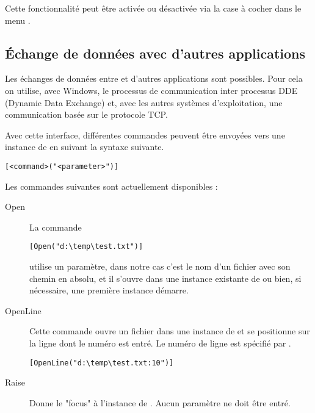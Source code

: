 
Cette fonctionnalité peut être activée ou désactivée via la case à cocher  dans le menu .


\subsection{Échange de données avec d'autres applications}

Les échanges de données entre \codeblocks et d'autres applications sont possibles. Pour cela on utilise, avec Windows, le processus de communication inter processus DDE (Dynamic Data Exchange) et, avec les autres systèmes d'exploitation, une communication basée sur le protocole TCP.

Avec cette interface, différentes commandes peuvent être envoyées vers une instance de \codeblocks en suivant la syntaxe suivante.

\begin{lstlisting}
[<command>("<parameter>")]
\end{lstlisting}

Les commandes suivantes sont actuellement disponibles :

\begin{description}
\item[Open] La commande

\begin{lstlisting}
[Open("d:\temp\test.txt")]
\end{lstlisting}

utilise un paramètre, dans notre cas c'est le nom d'un fichier avec son chemin en absolu, et il s'ouvre dans une instance existante de \codeblocks ou bien, si nécessaire, une première instance démarre.
\item[OpenLine] Cette commande ouvre un fichier dans une instance de \codeblocks et se positionne sur la ligne dont le numéro est entré. Le numéro de ligne est spécifié par .

\begin{lstlisting}
[OpenLine("d:\temp\test.txt:10")]
\end{lstlisting}

\item[Raise] Donne le "focus" à l'instance de \codeblocks. Aucun paramètre ne doit être entré.
\end{description}

